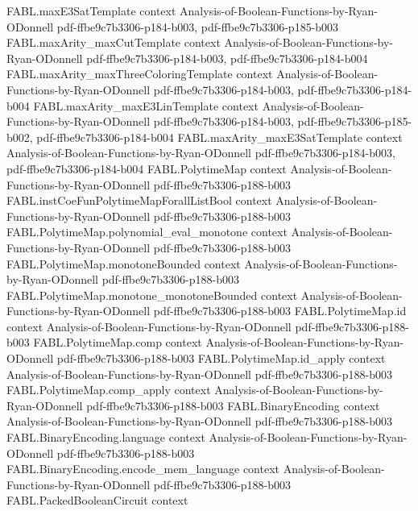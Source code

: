 \begin{theorem}
\proofstep
  {FABL.maxE3SatTemplate}
  {context}
  {Analysis-of-Boolean-Functions-by-Ryan-ODonnell}
  {pdf-ffbe9c7b3306-p184-b003,
    pdf-ffbe9c7b3306-p185-b003}
\proofstep
  {FABL.maxArity_maxCutTemplate}
  {context}
  {Analysis-of-Boolean-Functions-by-Ryan-ODonnell}
  {pdf-ffbe9c7b3306-p184-b003,
    pdf-ffbe9c7b3306-p184-b004}
\proofstep
  {FABL.maxArity_maxThreeColoringTemplate}
  {context}
  {Analysis-of-Boolean-Functions-by-Ryan-ODonnell}
  {pdf-ffbe9c7b3306-p184-b003,
    pdf-ffbe9c7b3306-p184-b004}
\proofstep
  {FABL.maxArity_maxE3LinTemplate}
  {context}
  {Analysis-of-Boolean-Functions-by-Ryan-ODonnell}
  {pdf-ffbe9c7b3306-p184-b003,
    pdf-ffbe9c7b3306-p185-b002,
    pdf-ffbe9c7b3306-p184-b004}
\proofstep
  {FABL.maxArity_maxE3SatTemplate}
  {context}
  {Analysis-of-Boolean-Functions-by-Ryan-ODonnell}
  {pdf-ffbe9c7b3306-p184-b003,
    pdf-ffbe9c7b3306-p184-b004}
\proofstep
  {FABL.PolytimeMap}
  {context}
  {Analysis-of-Boolean-Functions-by-Ryan-ODonnell}
  {pdf-ffbe9c7b3306-p188-b003}
\proofstep
  {FABL.instCoeFunPolytimeMapForallListBool}
  {context}
  {Analysis-of-Boolean-Functions-by-Ryan-ODonnell}
  {pdf-ffbe9c7b3306-p188-b003}
\proofstep
  {FABL.PolytimeMap.polynomial_eval_monotone}
  {context}
  {Analysis-of-Boolean-Functions-by-Ryan-ODonnell}
  {pdf-ffbe9c7b3306-p188-b003}
\proofstep
  {FABL.PolytimeMap.monotoneBounded}
  {context}
  {Analysis-of-Boolean-Functions-by-Ryan-ODonnell}
  {pdf-ffbe9c7b3306-p188-b003}
\proofstep
  {FABL.PolytimeMap.monotone_monotoneBounded}
  {context}
  {Analysis-of-Boolean-Functions-by-Ryan-ODonnell}
  {pdf-ffbe9c7b3306-p188-b003}
\proofstep
  {FABL.PolytimeMap.id}
  {context}
  {Analysis-of-Boolean-Functions-by-Ryan-ODonnell}
  {pdf-ffbe9c7b3306-p188-b003}
\proofstep
  {FABL.PolytimeMap.comp}
  {context}
  {Analysis-of-Boolean-Functions-by-Ryan-ODonnell}
  {pdf-ffbe9c7b3306-p188-b003}
\proofstep
  {FABL.PolytimeMap.id_apply}
  {context}
  {Analysis-of-Boolean-Functions-by-Ryan-ODonnell}
  {pdf-ffbe9c7b3306-p188-b003}
\proofstep
  {FABL.PolytimeMap.comp_apply}
  {context}
  {Analysis-of-Boolean-Functions-by-Ryan-ODonnell}
  {pdf-ffbe9c7b3306-p188-b003}
\proofstep
  {FABL.BinaryEncoding}
  {context}
  {Analysis-of-Boolean-Functions-by-Ryan-ODonnell}
  {pdf-ffbe9c7b3306-p188-b003}
\proofstep
  {FABL.BinaryEncoding.language}
  {context}
  {Analysis-of-Boolean-Functions-by-Ryan-ODonnell}
  {pdf-ffbe9c7b3306-p188-b003}
\proofstep
  {FABL.BinaryEncoding.encode_mem_language}
  {context}
  {Analysis-of-Boolean-Functions-by-Ryan-ODonnell}
  {pdf-ffbe9c7b3306-p188-b003}
\proofstep
  {FABL.PackedBooleanCircuit}
  {context}

\end{theorem}
